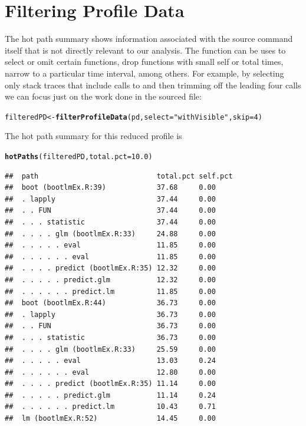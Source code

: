 \documentclass[nojss]{jss}\usepackage[]{graphicx}\usepackage[]{color}
\makeatletter
\newcommand{\hlnum}[1]{\textcolor[rgb]{0.686,0.059,0.569}{#1}}%
\newcommand{\hlstr}[1]{\textcolor[rgb]{0.192,0.494,0.8}{#1}}%
\newcommand{\hlstd}[1]{\textcolor[rgb]{0.345,0.345,0.345}{#1}}%
\newcommand{\hlkwb}[1]{\textcolor[rgb]{0.69,0.353,0.396}{#1}}%
\newcommand{\hlkwc}[1]{\textcolor[rgb]{0.333,0.667,0.333}{#1}}%
\newcommand{\hlkwd}[1]{\textcolor[rgb]{0.737,0.353,0.396}{\textbf{#1}}}%
\newenvironment{kframe}{%
 \def\at@end@of@kframe{}%
 \ifinner\ifhmode%
  \def\at@end@of@kframe{\end{minipage}}%
  \begin{minipage}{\columnwidth}%
 \fi\fi%
 \def\FrameCommand##1{\hskip\@totalleftmargin \hskip-\fboxsep
 \colorbox{shadecolor}{##1}\hskip-\fboxsep
     \hskip-\linewidth \hskip-\@totalleftmargin \hskip\columnwidth}%
 \MakeFramed {\advance\hsize-\width
   \@totalleftmargin\z@ \linewidth\hsize
   \@setminipage}}%
 {\par\unskip\endMakeFramed%
 \at@end@of@kframe}
\newenvironment{knitrout}{}{} %
\makeatother
\begin{document}
\section{Filtering Profile Data}
The hot path summary shows information associated with the source
command itself that is not directly relevant to our analysis. The
 function can be uses to select or omit
certain functions, drop functions with small self or total times,
narrow to a particular time interval, among others.  For example, by
selecting only stack traces that include calls to 
and then trimming off the leading four calls we can focus just on the
work done in the sourced file:
\begin{knitrout}\small
{}\color{fgcolor}\begin{kframe}
\begin{alltt}
\hlstd{filteredPD} \hlkwb{<-} \hlkwd{filterProfileData}\hlstd{(pd,} \hlkwc{select} \hlstd{=} \hlstr{"withVisible"}\hlstd{,} \hlkwc{skip} \hlstd{=} \hlnum{4}\hlstd{)}
\end{alltt}
\end{kframe}
\end{knitrout}
The hot path summary for this reduced profile is
\begin{knitrout}\small
{}\color{fgcolor}\begin{kframe}
\begin{alltt}
\hlkwd{hotPaths}\hlstd{(filteredPD,} \hlkwc{total.pct} \hlstd{=} \hlnum{10.0}\hlstd{)}
\end{alltt}
\begin{verbatim}
##  path                            total.pct self.pct
##  boot (bootlmEx.R:39)            37.68     0.00    
##  . lapply                        37.44     0.00    
##  . . FUN                         37.44     0.00    
##  . . . statistic                 37.44     0.00    
##  . . . . glm (bootlmEx.R:33)     24.88     0.00    
##  . . . . . eval                  11.85     0.00    
##  . . . . . . eval                11.85     0.00    
##  . . . . predict (bootlmEx.R:35) 12.32     0.00    
##  . . . . . predict.glm           12.32     0.00    
##  . . . . . . predict.lm          11.85     0.00    
##  boot (bootlmEx.R:44)            36.73     0.00    
##  . lapply                        36.73     0.00    
##  . . FUN                         36.73     0.00    
##  . . . statistic                 36.73     0.00    
##  . . . . glm (bootlmEx.R:33)     25.59     0.00    
##  . . . . . eval                  13.03     0.24    
##  . . . . . . eval                12.80     0.00    
##  . . . . predict (bootlmEx.R:35) 11.14     0.00    
##  . . . . . predict.glm           11.14     0.24    
##  . . . . . . predict.lm          10.43     0.71    
##  lm (bootlmEx.R:52)              14.45     0.00
\end{verbatim}
\end{kframe}
\end{knitrout}
\end{document}
